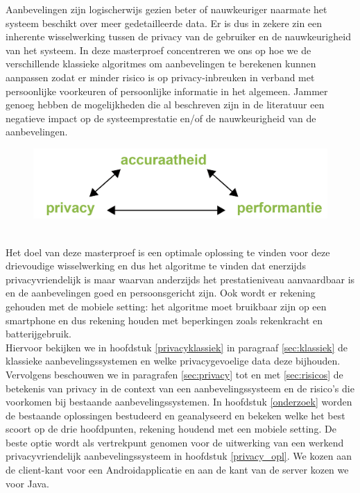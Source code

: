 Aanbevelingen zijn logischerwijs gezien beter of nauwkeuriger naarmate het systeem beschikt over meer gedetailleerde data. Er is dus in zekere zin een inherente wisselwerking tussen de privacy van de gebruiker en de nauwkeurigheid van het systeem. In deze masterproef concentreren we ons op hoe we de verschillende klassieke algoritmes om aanbevelingen te berekenen kunnen aanpassen zodat er minder risico is op privacy-inbreuken in verband met persoonlijke voorkeuren of persoonlijke informatie in het algemeen. Jammer genoeg hebben de mogelijkheden die al beschreven zijn in de literatuur een negatieve impact op de systeemprestatie en/of de nauwkeurigheid van de aanbevelingen. 
\begin{figure}[htpb]   
    \label{Figuur::wisselwerking}      
  \begin{center}    
 \includegraphics[width=\textwidth,height=\textheight,keepaspectratio]{fig/wisselwerking}    
  \end{center}     
   \end{figure}\\
Het doel van deze masterproef is een optimale oplossing te vinden voor deze drievoudige wisselwerking en dus het algoritme te vinden dat enerzijds privacyvriendelijk is maar waarvan anderzijds het prestatieniveau aanvaardbaar is en de aanbevelingen goed en persoonsgericht zijn. Ook wordt er rekening gehouden met de mobiele setting: het algoritme moet bruikbaar zijn op een smartphone en dus rekening houden met beperkingen zoals rekenkracht en batterijgebruik.\\

Hiervoor bekijken we in hoofdstuk \ref{privacyklassiek} in paragraaf \ref{sec:klassiek} de klassieke aanbevelingssystemen en welke privacygevoelige data deze bijhouden. Vervolgens beschouwen we in paragrafen \ref{sec:privacy} tot en met \ref{sec:risicos} de betekenis van privacy in de context van een aanbevelingssysteem en de risico's die voorkomen bij bestaande aanbevelingssystemen. In hoofdstuk \ref{onderzoek} worden de bestaande oplossingen bestudeerd en geanalyseerd en bekeken welke het best scoort op de drie hoofdpunten, rekening houdend met een mobiele setting. De beste optie wordt als vertrekpunt genomen voor de uitwerking van een werkend privacyvriendelijk aanbevelingssysteem in hoofdstuk \ref{privacy_opl}. We kozen aan de client-kant voor een Androidapplicatie en aan de kant van de server kozen we voor Java.
 
